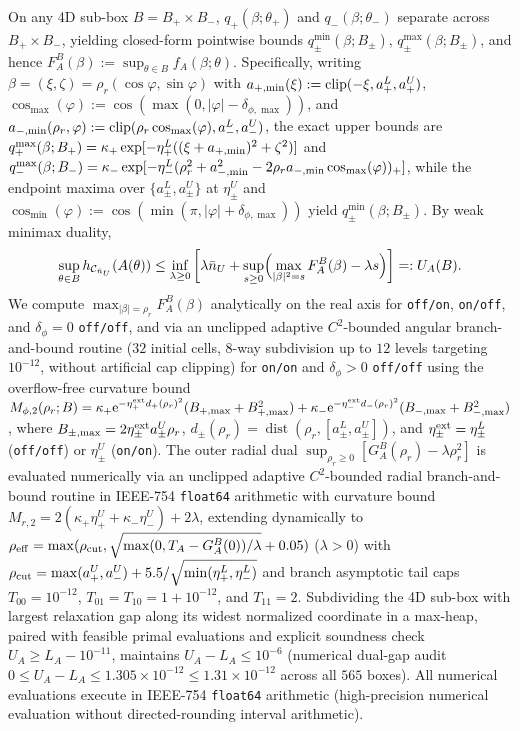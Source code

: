 \documentclass{iopjournal}
\newcommand{\clip}{\operatorname{clip}}
\newcommand{\Cset}{\mathcal{C}}
\newcommand{\nU}{\bar n_U}
\newcommand{\abs}[1]{\lvert #1\rvert}
\newcommand{\ee}{\mathrm{e}}
\begin{document}
On any 4D sub-box $B = B_+ \times B_-$, $q_+(\beta;\theta_+)$ and $q_-(\beta;\theta_-)$ separate across $B_+ \times B_-$, yielding closed-form pointwise bounds $q_\pm^{\min}(\beta;B_\pm)$, $q_\pm^{\max}(\beta;B_\pm)$, and hence $F_A^B(\beta) := \sup_{\theta \in B} f_A(\beta;\theta)$. Specifically, writing $\beta = (\xi,\zeta) = \rho_r(\cos\varphi,\sin\varphi)$ with $a_{+,\rm min}(\xi) := \clip(-\xi, a_+^L, a_+^U)$, $\cos_{\max}(\varphi) := \cos(\max(0, \abs{\varphi}-\delta_{\phi,\max}))$, and $a_{-,\rm min}(\rho_r,\varphi) := \clip(\rho_r\cos_{\max}(\varphi), a_-^L, a_-^U)$, the exact upper bounds are $q_+^{\max}(\beta;B_+) = \kappa_+\exp[-\eta_+^L((\xi+a_{+,\rm min})^2+\zeta^2)]$ and $q_-^{\max}(\beta;B_-) = \kappa_-\exp[-\eta_-^L(\rho_r^2 + a_{-,\rm min}^2 - 2\rho_r a_{-,\rm min}\cos_{\max}(\varphi))_+]$, while the endpoint maxima over $\{a_\pm^L, a_\pm^U\}$ at $\eta_\pm^U$ and $\cos_{\min}(\varphi) := \cos(\min(\pi, \abs{\varphi}+\delta_{\phi,\max}))$ yield $q_\pm^{\min}(\beta;B_\pm)$. By weak minimax duality,
\begin{equation}\label{eq:decoupled-dual}
\sup_{\theta\in B} h_{\Cset_{\nU}}(A(\theta)) \le \inf_{\lambda \ge 0}\left[\lambda \nU + \sup_{s \ge 0}\Bigl(\max_{\abs{\beta}^2=s} F_A^B(\beta) - \lambda s\Bigr)\right] =: U_A(B).
\end{equation}
We compute $\max_{\abs{\beta}=\rho_r} F_A^B(\beta)$ analytically on the real axis for \texttt{off/on}, \texttt{on/off}, and $\delta_\phi=0$ \texttt{off/off}, and via an unclipped adaptive $C^2$-bounded angular branch-and-bound routine ($32$ initial cells, $8$-way subdivision up to $12$ levels targeting $10^{-12}$, without artificial cap clipping) for \texttt{on/on} and $\delta_\phi > 0$ \texttt{off/off} using the overflow-free curvature bound $M_{\phi,2}(\rho_r;B) = \kappa_+\ee^{-\eta_+^{\rm ext} d_+(\rho_r)^2}(B_{+,\max}+B_{+,\max}^2) + \kappa_-\ee^{-\eta_-^{\rm ext} d_-(\rho_r)^2}(B_{-,\max}+B_{-,\max}^2)$, where $B_{\pm,\max} = 2\eta_\pm^{\rm ext} a_\pm^U \rho_r$, $d_\pm(\rho_r) = \operatorname{dist}(\rho_r, [a_\pm^L, a_\pm^U])$, and $\eta_\pm^{\rm ext} = \eta_\pm^L$ (\texttt{off/off}) or $\eta_\pm^U$ (\texttt{on/on}). The outer radial dual $\sup_{\rho_r \ge 0}[G_A^B(\rho_r) - \lambda \rho_r^2]$ is evaluated numerically via an unclipped adaptive $C^2$-bounded radial branch-and-bound routine in IEEE-754 \texttt{float64} arithmetic with curvature bound $M_{r,2} = 2(\kappa_+\eta_+^U + \kappa_-\eta_-^U) + 2\lambda$, extending dynamically to $\rho_{\rm eff} = \max(\rho_{\rm cut}, \sqrt{\max(0, T_A - G_A^B(0))/\lambda} + 0.05)$ ($\lambda > 0$) with $\rho_{\rm cut} = \max(a_+^U, a_-^U) + 5.5/\sqrt{\min(\eta_+^L,\eta_-^L)}$ and branch asymptotic tail caps $T_{00} = 10^{-12}$, $T_{01} = T_{10} = 1 + 10^{-12}$, and $T_{11} = 2$. Subdividing the 4D sub-box with largest relaxation gap along its widest normalized coordinate in a max-heap, paired with feasible primal evaluations and explicit soundness check $U_A \ge L_A - 10^{-11}$, maintains $U_A - L_A \le 10^{-6}$ (numerical dual-gap audit $0 \le U_A - L_A \le 1.305 \times 10^{-12} \le 1.31 \times 10^{-12}$ across all $565$ boxes). All numerical evaluations execute in IEEE-754 \texttt{float64} arithmetic (high-precision numerical evaluation without directed-rounding interval arithmetic).
\end{document}
